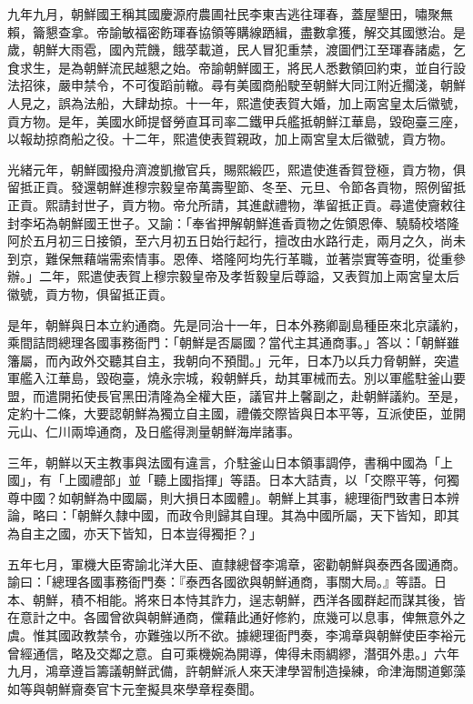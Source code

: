 \begin{pinyinscope}
九年九月，朝鮮國王稱其國慶源府農圃社民李東吉逃往琿春，蓋屋墾田，嘯聚無賴，籥懇查拿。帝諭敏福密飭琿春協領等購線跴緝，盡數拿獲，解交其國懲治。是歲，朝鮮大雨雹，國內荒饑，餓莩載道，民人冒犯重禁，渡圖們江至琿春諸處，乞食求生，是為朝鮮流民越懇之始。帝諭朝鮮國王，將民人悉數領回約束，並自行設法招徠，嚴申禁令，不可復蹈前轍。尋有美國商船駛至朝鮮大同江附近擱淺，朝鮮人見之，誤為法船，大肆劫掠。十一年，熙遣使表賀大婚，加上兩宮皇太后徽號，貢方物。是年，美國水師提督勞直耳司率二鐵甲兵艦抵朝鮮江華島，毀砲臺三座，以報劫掠商船之役。十二年，熙遣使表賀親政，加上兩宮皇太后徽號，貢方物。

光緒元年，朝鮮國撥舟濟渡凱撤官兵，賜熙緞匹，熙遣使進香賀登極，貢方物，俱留抵正貢。發還朝鮮進穆宗毅皇帝萬壽聖節、冬至、元旦、令節各貢物，照例留抵正貢。熙請封世子，貢方物。帝允所請，其進獻禮物，準留抵正貢。尋遣使齎敕往封李坧為朝鮮國王世子。又諭：「奉省押解朝鮮進香貢物之佐領恩俸、驍騎校塔隆阿於五月初三日接領，至六月初五日始行起行，擅改由水路行走，兩月之久，尚未到京，難保無藉端需索情事。恩俸、塔隆阿均先行革職，並著崇實等查明，從重參辦。」二年，熙遣使表賀上穆宗毅皇帝及孝哲毅皇后尊謚，又表賀加上兩宮皇太后徽號，貢方物，俱留抵正貢。

是年，朝鮮與日本立約通商。先是同治十一年，日本外務卿副島種臣來北京議約，乘間詰問總理各國事務衙門：「朝鮮是否屬國？當代主其通商事。」答以：「朝鮮雖籓屬，而內政外交聽其自主，我朝向不預聞。」元年，日本乃以兵力脅朝鮮，突遣軍艦入江華島，毀砲臺，燒永宗城，殺朝鮮兵，劫其軍械而去。別以軍艦駐釜山要盟，而遣開拓使長官黑田清隆為全權大臣，議官井上馨副之，赴朝鮮議約。至是，定約十二條，大要認朝鮮為獨立自主國，禮儀交際皆與日本平等，互派使臣，並開元山、仁川兩埠通商，及日艦得測量朝鮮海岸諸事。

三年，朝鮮以天主教事與法國有違言，介駐釜山日本領事調停，書稱中國為「上國」，有「上國禮部」並「聽上國指揮」等語。日本大詰責，以「交際平等，何獨尊中國？如朝鮮為中國屬，則大損日本國體」。朝鮮上其事，總理衙門致書日本辨論，略曰：「朝鮮久隸中國，而政令則歸其自理。其為中國所屬，天下皆知，即其為自主之國，亦天下皆知，日本豈得獨拒？」

五年七月，軍機大臣寄諭北洋大臣、直隸總督李鴻章，密勸朝鮮與泰西各國通商。諭曰：「總理各國事務衙門奏：『泰西各國欲與朝鮮通商，事關大局。』等語。日本、朝鮮，積不相能。將來日本恃其詐力，逞志朝鮮，西洋各國群起而謀其後，皆在意計之中。各國曾欲與朝鮮通商，儻藉此通好修約，庶幾可以息事，俾無意外之虞。惟其國政教禁令，亦難強以所不欲。據總理衙門奏，李鴻章與朝鮮使臣李裕元曾經通信，略及交鄰之意。自可乘機婉為開導，俾得未雨綢繆，潛弭外患。」六年九月，鴻章遵旨籌議朝鮮武備，許朝鮮派人來天津學習制造操練，命津海關道鄭藻如等與朝鮮齎奏官卞元奎擬具來學章程奏聞。


\end{pinyinscope}

